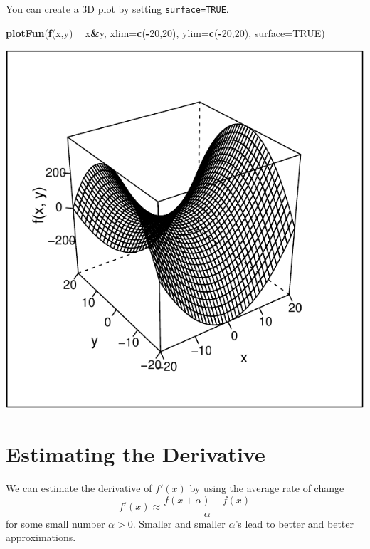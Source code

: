 \documentclass[
]{book}
\newenvironment{Shaded}{\begin{snugshade}}{\end{snugshade}}
\newcommand{\DataTypeTok}[1]{\textcolor[rgb]{0.13,0.29,0.53}{#1}}
\newcommand{\DecValTok}[1]{\textcolor[rgb]{0.00,0.00,0.81}{#1}}
\newcommand{\KeywordTok}[1]{\textcolor[rgb]{0.13,0.29,0.53}{\textbf{#1}}}
\newcommand{\NormalTok}[1]{#1}
\newcommand{\OperatorTok}[1]{\textcolor[rgb]{0.81,0.36,0.00}{\textbf{#1}}}
\newcommand{\OtherTok}[1]{\textcolor[rgb]{0.56,0.35,0.01}{#1}}
\newcommand{\StringTok}[1]{\textcolor[rgb]{0.31,0.60,0.02}{#1}}
\begin{document}
You can create a 3D plot by setting \texttt{surface=TRUE}.

\begin{Shaded}
\begin{Highlighting}[]
\KeywordTok{plotFun}\NormalTok{(}\KeywordTok{f}\NormalTok{(x,y) }\OperatorTok{~}\StringTok{ }\NormalTok{x}\OperatorTok{&}\NormalTok{y, }\DataTypeTok{xlim=}\KeywordTok{c}\NormalTok{(}\OperatorTok{-}\DecValTok{20}\NormalTok{,}\DecValTok{20}\NormalTok{), }\DataTypeTok{ylim=}\KeywordTok{c}\NormalTok{(}\OperatorTok{-}\DecValTok{20}\NormalTok{,}\DecValTok{20}\NormalTok{), }\DataTypeTok{surface=}\OtherTok{TRUE}\NormalTok{)}
\end{Highlighting}
\end{Shaded}

\includegraphics{_bookdown_files/math135_handbook_files/figure-latex/unnamed-chunk-46-1.pdf}

\hypertarget{estimating-the-derivative}{%
\section{Estimating the Derivative}\label{estimating-the-derivative}}

We can estimate the derivative of \(f'(x)\) by using the average rate of change
\[
f'(x) \approx\frac{f(x+\alpha)-f(x)}{\alpha}
\]
for some small number \(\alpha > 0\). Smaller and smaller \(\alpha\)'s lead to better and better approximations.
\end{document}
